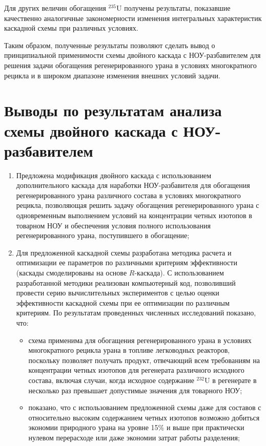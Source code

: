 Для других величин обогащения $^{235}$U получены результаты, показавшие качественно аналогичные закономерности изменения интегральных характеристик каскадной схемы при различных условиях. 

Таким образом, полученные результаты позволяют сделать вывод о принципиальной применимости схемы двойного каскада с НОУ-разбавителем для решения задачи обогащения регенерированного урана в условиях многократного рецикла и в широком диапазоне изменения внешних условий задачи.    

\section{Выводы по результатам анализа схемы двойного каскада с НОУ-разбавителем}

\begin{enumerate}
    \item Предложена модификация двойного каскада с использованием дополнительного каскада для наработки НОУ-разбавителя для обогащения регенерированного урана различного состава в условиях многократного рецикла, позволяющая решить задачу обогащения регенерированного урана с одновременным выполнением условий на концентрации четных изотопов в товарном НОУ и обеспечения условия полного использования регенерированного урана, поступившего в обогащение;
    \item Для предложенной каскадной схемы разработана методика расчета и оптимизации ее параметров по различными критериям эффективности (каскады смоделированы на основе $R$-каскада). С использованием разработанной методики реализован компьютерный код, позволивший провести серию вычислительных экспериментов с целью оценки эффективности каскадной схемы при ее оптимизации по различным критериям. По результатам проведенных численных исследований показано, что:
    \begin{itemize}
        \item схема применима для обогащения регенерированного урана в условиях многократного рецикла урана в топливе легководных реакторов, поскольку позволяет получать продукт, отвечающий всем требованиям на концентрации четных изотопов для регенерата различного исходного состава, включая случаи, когда исходное содержание $^{232}$U в регенерате в несколько раз превышает допустимые значения для товарного НОУ;
        \item показано, что с использованием предложенной схемы даже для составов с относительно высоким содержанием четных изотопов возможно добиться экономии природного урана на уровне 15\% и выше при практически нулевом перерасходе или даже экономии затрат работы разделения;

\end{itemize}
\end{enumerate}
